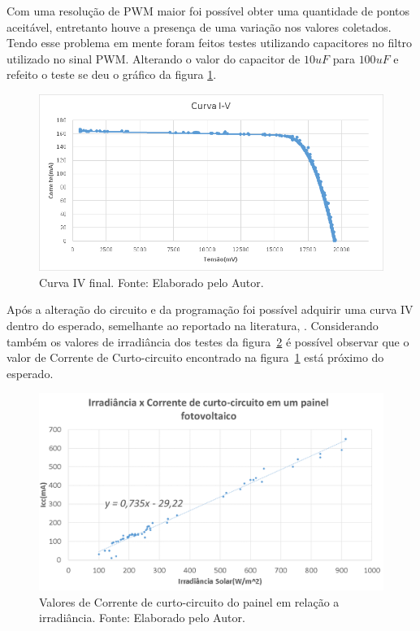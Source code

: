 Com uma resolução de PWM maior foi possível obter uma quantidade de pontos aceitável, entretanto houve a presença de uma variação nos valores coletados. Tendo esse problema em mente foram feitos testes utilizando capacitores no filtro utilizado no sinal PWM. Alterando o valor do capacitor de $10 uF$ para $100 uF$ e refeito o teste se deu o gráfico da figura \ref{fig:CurvaIVBoa}.

\FloatBarrier
\begin{figure}[!htbp]
	\centering
	\includegraphics[scale=1.0]{imagens/CurvaIVfinal}
	\caption{Curva IV final. Fonte: Elaborado pelo Autor. 	}
	\label{fig:CurvaIVBoa}
\end{figure}
\FloatBarrier


Após a alteração do circuito e da programação foi possível adquirir uma curva IV dentro do esperado, semelhante ao reportado na literatura, .
Considerando também os valores de irradiância dos testes da figura~\ref{fig:Icc} é possível observar que o valor de Corrente de Curto-circuito encontrado na figura~\ref{fig:CurvaIVBoa} está próximo do esperado.

\FloatBarrier
\begin{figure}[!htbp]
	\centering
	\includegraphics[scale=0.45]{imagens/Icc.png}
	\caption{Valores de Corrente de curto-circuito do painel em relação a irradiância. Fonte: Elaborado pelo Autor. 	}
	\label{fig:Icc}
\end{figure}
\FloatBarrier

